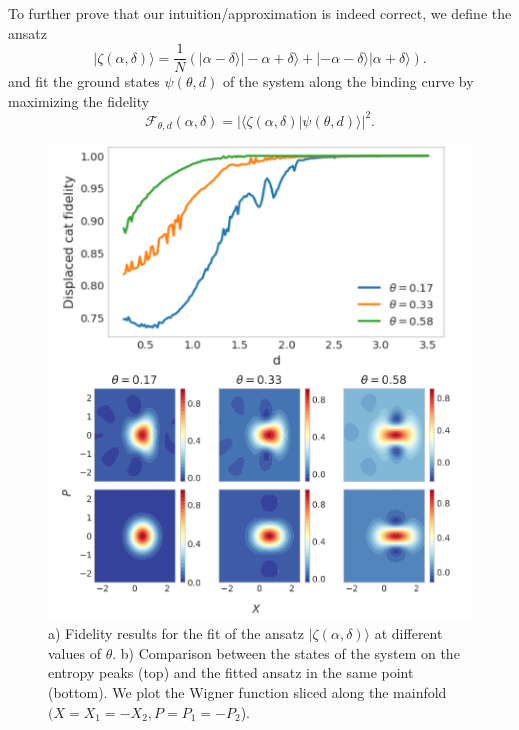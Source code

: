 \documentclass[reprint, amsmath, amssymb, floatfix, aps, pra]{revtex4-2}
\newcommand{\ket}[1]{|#1\rangle}
\newcommand{\braket}[3][2]{\langle #2|#3 \rangle}
\begin{document}
To further prove that our intuition/approximation is indeed correct, we define the ansatz
\begin{equation}
    \ket{\zeta(\alpha, \delta)} = \frac{1}{N}\left(\ket{\alpha-\delta}\ket{-\alpha + \delta} + \ket{-\alpha-\delta}\ket{\alpha + \delta}\right).
\end{equation}
and fit the ground states $\psi(\theta, d)$ of the system along the binding curve by maximizing the fidelity
\begin{equation}
    \mathcal{F}_{\theta, d}(\alpha, \delta) = |\braket{\zeta(\alpha, \delta)}{\psi(\theta, d)}|^2.
\end{equation}
\begin{figure}[h]
    \hspace{-0.5cm}
    \centering
    \includegraphics[scale=0.6]{figures/fidecats.pdf}
    \caption{a) Fidelity results for the fit of the ansatz $\ket{\zeta(\alpha, \delta)}$ at different values of $\theta$. b) Comparison between the states of the system on the entropy peaks (top) and the fitted ansatz in the same point (bottom). We plot the Wigner function sliced along the mainfold $(X = X_1 = -X_2, P = P_1 = -P_2$).}
    \label{fig:fidecats}
\end{figure}
\end{document}
